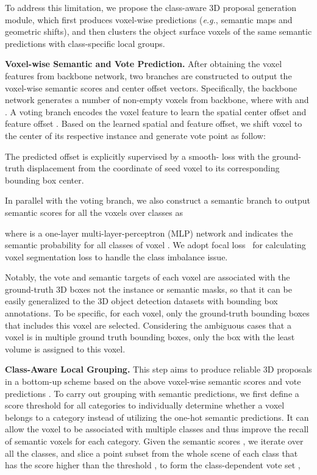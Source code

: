 \documentclass{article}
\begin{document}
To address this limitation, we propose the class-aware 3D proposal generation module, which first produces voxel-wise predictions (\textit{e.g.}, semantic maps and geometric shifts), and then clusters the object surface voxels of the same semantic predictions with class-specific local groups. 

\textbf{Voxel-wise Semantic and Vote Prediction.}
After obtaining the voxel features from backbone network, two branches are constructed to output the voxel-wise semantic scores and center offset vectors. Specifically, the backbone network generates a number of  non-empty voxels  from backbone, where  with  and . A voting branch encodes the voxel feature  to learn the spatial center offset  and feature offset . Based on the learned spatial and feature offset, we shift voxel  to the center of its respective instance and generate vote point  as follow:

The predicted offset  is explicitly supervised by a smooth- loss with the ground-truth displacement from the coordinate of seed voxel  to its corresponding bounding box center.

In parallel with the voting branch, we also construct a semantic branch to output semantic scores  for all the voxels over  classes as

where  is a one-layer multi-layer-perceptron (MLP) network and  indicates the semantic probability for all classes of voxel . We adopt focal loss~\cite{lin2017focal} for calculating voxel segmentation loss to handle the class imbalance issue.

Notably, the vote and semantic targets of each voxel are associated with the ground-truth 3D boxes not the instance or semantic masks, so that it can be easily generalized to the 3D object detection datasets with bounding box annotations. To be specific, for each voxel, only the ground-truth bounding boxes that includes this voxel are selected. Considering the ambiguous cases that a voxel is in multiple ground truth bounding boxes, only the box with the least volume is assigned to this voxel. 

\textbf{Class-Aware Local Grouping.} This step aims to produce reliable 3D proposals in a bottom-up scheme based on the above voxel-wise semantic scores  and vote predictions . To carry out grouping with semantic predictions, we first define a score threshold  for all  categories to 
individually determine whether a voxel belongs to a category instead of utilizing the one-hot semantic predictions.
It can allow the voxel to be associated with multiple classes and thus improve the recall of semantic voxels for each category. Given the semantic scores , we iterate over all the classes, and slice a point subset from the whole scene of each class that has the score higher than the threshold , to form the class-dependent vote set ,
\end{document}
